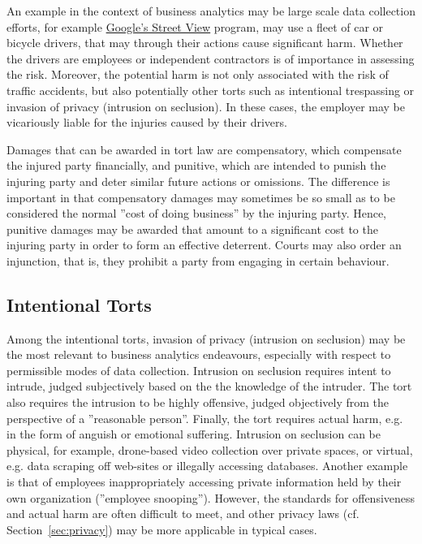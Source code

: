 An example in the context of business analytics may be large scale data collection efforts, for example \href{https://en.wikipedia.org/wiki/Google_Street_View}{Google's Street View} program, may use a fleet of car or bicycle drivers, that may through their actions cause significant harm. Whether the drivers are employees or independent contractors is of importance in assessing the risk. Moreover, the potential harm is not only associated with the risk of traffic accidents, but also potentially other torts such as intentional trespassing or invasion of privacy (intrusion on seclusion). In these cases, the employer may be vicariously liable for the injuries caused by their drivers. 

Damages that can be awarded in tort law are compensatory, which compensate the injured party financially, and punitive, which are intended to punish the injuring party and deter similar future actions or omissions. The difference is important in that compensatory damages may sometimes be so small as to be considered the normal ''cost of doing business'' by the injuring party. Hence, punitive damages may be awarded that amount to a significant cost to the injuring party in order to form an effective deterrent. Courts may also order an injunction, that is, they prohibit a party from engaging in certain behaviour.

\subsection*{Intentional Torts}

Among the intentional torts, invasion of privacy (intrusion on seclusion)  may be the most relevant to business analytics endeavours, especially with respect to permissible modes of data collection. Intrusion on seclusion requires intent to intrude, judged subjectively based on the the knowledge of the intruder. The tort also requires the intrusion to be highly offensive, judged objectively from the perspective of a ''reasonable person''. Finally, the tort requires actual harm, e.g. in the form of anguish or emotional suffering. Intrusion on seclusion can be physical, for example, drone-based video collection over private spaces, or virtual, e.g. data scraping off web-sites or illegally accessing databases. Another example is that of employees inappropriately accessing private information held by their own organization (''employee snooping''). However, the standards for offensiveness and actual harm are often difficult to meet, and other privacy laws (cf. Section~\ref{sec:privacy}) may be more applicable in typical cases.


